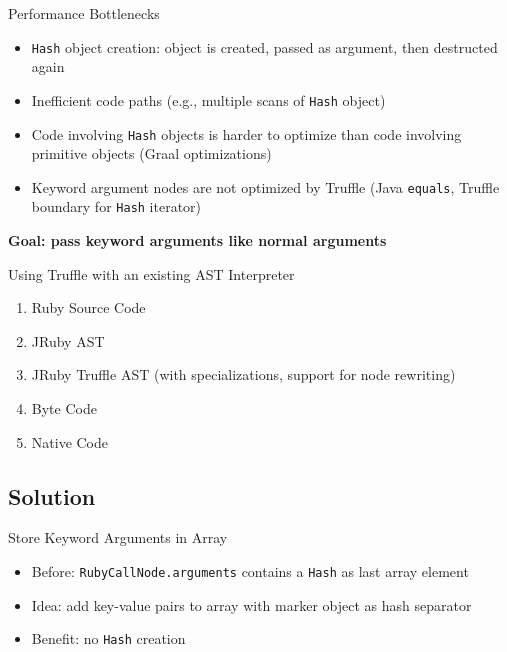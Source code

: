 \documentclass[xcolor=dvipsname,handout]{beamer} %
\begin{document}

\begin{frame}{Performance Bottlenecks}
\begin{itemize}
    \item \lstinline{Hash} object creation: object is created, passed as argument, then destructed again
    \item Inefficient code paths (e.g., multiple scans of \lstinline{Hash} object)
    \item Code involving \lstinline{Hash} objects is harder to optimize than code involving primitive objects (Graal optimizations)
    \item Keyword argument nodes are not optimized by Truffle (Java \lstinline{equals}, Truffle boundary for \lstinline{Hash} iterator)
\end{itemize}

\begin{table}
    \centering
\textbf{Goal: pass keyword arguments like normal arguments}
\end{table}
\end{frame}


\begin{frame}{Using Truffle with an existing AST Interpreter}
\begin{enumerate}
    \item Ruby Source Code
    \item JRuby AST
    \item JRuby Truffle AST (with specializations, support for node rewriting)
    \item Byte Code
    \item Native Code
\end{enumerate}
\end{frame}

\subsection{Solution}
\begin{frame}{Store Keyword Arguments in Array}
\begin{itemize}
    \item Before: \lstinline{RubyCallNode.arguments} contains a \lstinline{Hash} as last array element
    \item Idea: add key-value pairs to array with marker object as hash separator
    \item Benefit: no \lstinline{Hash} creation
\end{itemize}
\end{frame}
\end{document}
